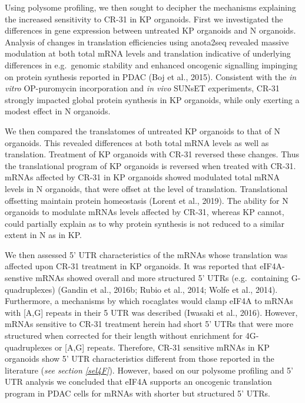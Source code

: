 \documentclass[12pt,openany]{book}
\begin{document}
Using polysome profiling, we then sought to decipher the mechanisms
explaining the increased sensitivity to CR-31 in KP organoids. First we
investigated the differences in gene expression between untreated KP
organoids and N organoids. Analysis of changes in translation
efficiencies using anota2seq revealed massive modulation at both total
mRNA levels and translation indicative of underlying differences in
e.g.~genomic stability and enhanced oncogenic signalling impinging on
protein synthesis reported in PDAC (Boj et al., 2015). Consistent with
the \emph{in vitro} OP-puromycin incorporation and \emph{in vivo} SUNsET
experiments, CR-31 strongly impacted global protein synthesis in KP
organoids, while only exerting a modest effect in N organoids.

We then compared the translatomes of untreated KP organoids to that of N
organoids. This revealed differences at both total mRNA levels as well
as translation. Treatment of KP organoids with CR-31 reversed these
changes. Thus the translational program of KP organoids is reversed when
treated with CR-31. mRNAs affected by CR-31 in KP organoids showed
modulated total mRNA levels in N organoids, that were offset at the
level of translation. Translational offsetting maintain protein
homeostasis (Lorent et al., 2019). The ability for N organoids to
modulate mRNAs levels affected by CR-31, whereas KP cannot, could
partially explain as to why protein synthesis is not reduced to a
similar extent in N as in KP.

We then assessed 5' UTR characteristics of the mRNAs whose translation
was affected upon CR-31 treatment in KP organoids. It was reported that
eIF4A-senstive mRNAs showed overall and more structured 5' UTRs
(e.g.~containing G-quadruplexes) (Gandin et al., 2016b; Rubio et al.,
2014; Wolfe et al., 2014). Furthermore, a mechanisms by which rocaglates
would clamp eIF4A to mRNAs with {[}A,G{]} repeats in their 5 UTR was
described (Iwasaki et al., 2016). However, mRNAs sensitive to CR-31
treatment herein had short 5' UTRs that were more structured when
corrected for their length without enrichment for 4G-quadruplexes or
{[}A,G{]} repeats. Therefore, CR-31 sensitive mRNAs in KP organoids show
5' UTR characteristics different from those reported in the literature
(\emph{see section \ref{sel4F}}). However, based on our polysome
profiling and 5' UTR analysis we concluded that eIF4A supports an
oncogenic translation program in PDAC cells for mRNAs with shorter but
structured 5' UTRs.
\end{document}
